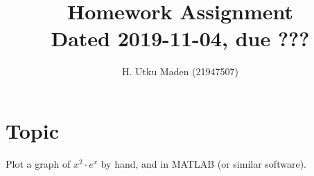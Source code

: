 \documentclass[12pt,a4paper]{ltxguide}
\title{
Homework Assignment\\
{\small Dated 2019-11-04, due ???}
}
\author{H. Utku Maden (21947507)}
\begin{document}
    
\maketitle

\section{Topic}

Plot a graph of \(x^2\cdot e^x\) by hand, and in MATLAB (or similar software).
\end{document}
